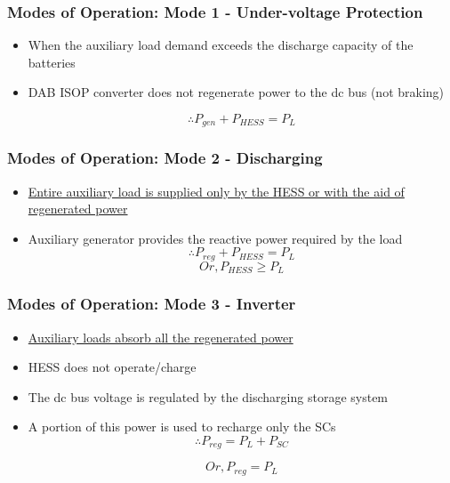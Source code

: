 \documentclass[aspectratio=169]{beamer}
\begin{document}
\begin{frame}
	\frametitle{Modes of Operation: Mode 1 - Under-voltage Protection}
	\label{frame:mode1}
	\begin{itemize}
		
		\item When the auxiliary load demand exceeds the discharge
		capacity of the batteries
		\item DAB ISOP converter does not regenerate power to the dc bus (not braking)
		\begin{center}
			

		
	 \begin{equation}{\therefore P_{gen}  + P_{HESS} = P_{L}}\end{equation}

\end{center}
	\end{itemize}
	
\end{frame}



\begin{frame}
	\frametitle{Modes of Operation: Mode 2 - Discharging}
	\label{frame:mode2}
	\begin{itemize}
		\item  \hyperlink{frame:modes}{Entire auxiliary load is supplied only by the HESS or with the aid of regenerated power}
		\item Auxiliary generator provides the reactive power required by the load
 	\begin{equation}{\therefore P_{reg} + P_{HESS} = P_{L}}\end{equation}
	\begin{equation} {Or, P_{HESS} \geq P_{L}} \end{equation}
		
	\end{itemize}
	
\end{frame}




\begin{frame}
	\frametitle{Modes of Operation: Mode 3 - Inverter}
	\label{frame:mode3}
	\begin{itemize}
		\item \hyperlink{frame:modes}{Auxiliary loads absorb all the regenerated
			power}
		\item  HESS	does not operate/charge
		\item The dc bus voltage is regulated by the discharging storage system
		\item A portion of this power is used to recharge
		only the SCs
	\begin{equation}	 {\therefore P_{reg} = P_{L} + P_{SC}} \end{equation}
		
	\begin{equation}	Or,{P_{reg} = P_{L}}  \end{equation}
		
	\end{itemize}
	
\end{frame}
\end{document}
